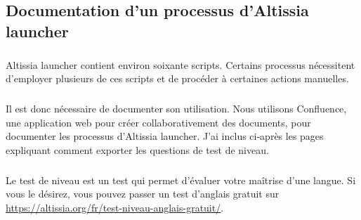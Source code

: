 \begin{appendix}
    \chapter{Documentation d'un processus d'Altissia launcher}
    \label{ch:altissia-launcher-doc}
    
    \paragraph{}
    Altissia launcher contient environ soixante scripts.
    Certains processus nécessitent d'employer plusieurs de ces scripts et de procéder à certaines actions manuelles.
    
    \paragraph{}
    Il est donc nécessaire de documenter son utilisation.
    Nous utilisons Confluence, une application web pour créer collaborativement des documents, pour documenter les processus d'Altissia launcher.
    J'ai inclus ci-après les pages expliquant comment exporter les questions de test de niveau.
    
    \paragraph{}
    Le test de niveau est un test qui permet d'évaluer votre maîtrise d'une langue.
    Si vous le désirez, vous pouvez passer un test d'anglais gratuit sur \url{https://altissia.org/fr/test-niveau-anglais-gratuit/}.
    
    
\end{appendix}